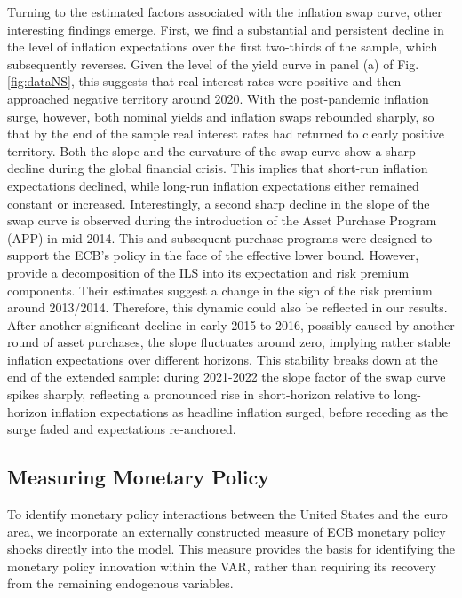 Turning to the estimated factors associated with the inflation swap curve, other interesting findings emerge. First, we find a substantial and persistent decline in the level of inflation expectations over the first two-thirds of the sample, which subsequently reverses. Given the level of the yield curve in panel (a) of Fig. \ref{fig:dataNS}, this suggests that real interest rates were positive and then approached negative territory around 2020. With the post-pandemic inflation surge, however, both nominal yields and inflation swaps rebounded sharply, so that by the end of the sample real interest rates had returned to clearly positive territory. Both the slope and the curvature of the swap curve show a sharp decline during the global financial crisis. This implies that short-run inflation expectations declined, while long-run inflation expectations either remained constant or increased. Interestingly, a second sharp decline in the slope of the swap curve is observed during the introduction of the Asset Purchase Program (APP) in mid-2014. This and subsequent purchase programs were designed to support the ECB's policy in the face of the effective lower bound. However, \cite{burban2021ILSrisk} provide a decomposition of the ILS into its expectation and risk premium components. Their estimates suggest a change in the sign of the risk premium around 2013/2014. Therefore, this dynamic could also be reflected in our results. After another significant decline in early 2015 to 2016, possibly caused by another round of asset purchases, the slope fluctuates around zero, implying rather stable inflation expectations over different horizons. This stability breaks down at the end of the extended sample: during 2021-2022 the slope factor of the swap curve spikes sharply, reflecting a pronounced rise in short-horizon relative to long-horizon inflation expectations as headline inflation surged, before receding as the surge faded and expectations re-anchored. %

\subsection{Measuring Monetary Policy}\label{sec:measuring}
To identify monetary policy interactions between the United States and the euro area, we incorporate an externally constructed measure of ECB monetary policy shocks directly into the model. This measure provides the basis for identifying the monetary policy innovation within the VAR, rather than requiring its recovery from the remaining endogenous variables. 


